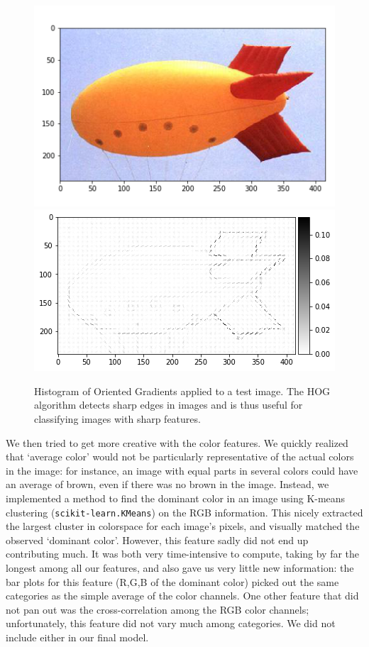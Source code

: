 \documentclass[aps,prl,twocolumn,superscriptaddress]{revtex4-1}
\renewcommand{\=}[1]{\stackrel{#1}{=}} %
\begin{document}
\begin{figure}
	\includegraphics[width = 0.45\columnwidth]{test_image.png}
	\includegraphics[width = 0.48\columnwidth]{test_image_HOG.png}
	\caption{\label{fig:HOG} Histogram of Oriented Gradients applied to a test image. The HOG algorithm detects sharp edges in images and is thus useful for classifying images with sharp features.}
\end{figure}

We then tried to get more creative with the color features. We quickly realized that `average color' would not be particularly representative of the actual colors in the image: for instance, an image with equal parts in several colors could have an average of brown, even if there was no brown in the image. Instead, we implemented a method to find the dominant color in an image using K-means clustering (\texttt{scikit-learn.KMeans}) on the RGB information. This nicely extracted the largest cluster in colorspace for each image's pixels, and visually matched the observed `dominant color'. However, this feature sadly did not end up contributing much. It was both very time-intensive to compute, taking by far the longest among all our features, and also gave us very little new information: the bar plots for this feature (R,G,B of the dominant color) picked out the same categories as the simple average of the color channels. One other feature that did not pan out was the cross-correlation among the RGB color channels; unfortunately, this feature did not vary much among categories. We did not include either in our final model.
\end{document}
